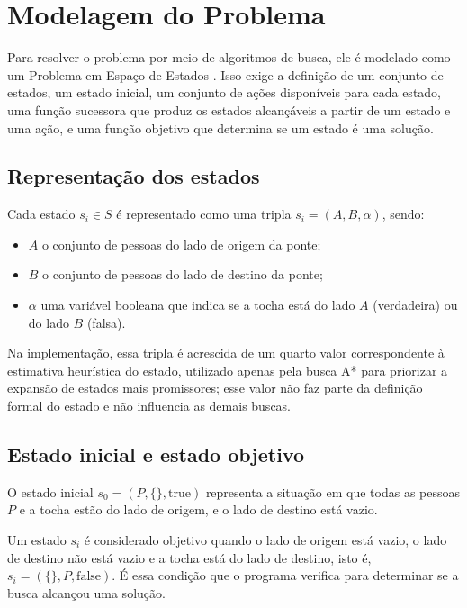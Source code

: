 \section{Modelagem do Problema}
\label{sec:modelagem}

Para resolver o problema por meio de algoritmos de busca, ele é modelado como
um Problema em Espaço de Estados \parencite{poole2010}. Isso exige a definição
de um conjunto de estados, um estado inicial, um conjunto de ações disponíveis
para cada estado, uma função sucessora que produz os estados alcançáveis a
partir de um estado e uma ação, e uma função objetivo que determina se um
estado é uma solução.

\subsection{Representação dos estados}

Cada estado $s_i \in S$ é representado como uma tripla $s_i = (A, B, \alpha)$,
sendo:
\begin{itemize}
	\item $A$ o conjunto de pessoas do lado de origem da ponte;
	\item $B$ o conjunto de pessoas do lado de destino da ponte;
	\item $\alpha$ uma variável booleana que indica se a tocha está do lado
	      $A$ (verdadeira) ou do lado $B$ (falsa).
\end{itemize}

Na implementação, essa tripla é acrescida de um quarto valor correspondente à
estimativa heurística do estado, utilizado apenas pela busca A* para
priorizar a expansão de estados mais promissores; esse valor não faz parte da
definição formal do estado e não influencia as demais buscas.

\subsection{Estado inicial e estado objetivo}

O estado inicial $s_0 = (P, \{\}, \text{true})$ representa a situação em que
todas as pessoas $P$ e a tocha estão do lado de origem, e o lado de destino
está vazio.

Um estado $s_i$ é considerado objetivo quando o lado de origem está vazio, o
lado de destino não está vazio e a tocha está do lado de destino, isto é,
$s_i = (\{\}, P, \text{false})$. É essa condição que o programa verifica para
determinar se a busca alcançou uma solução.

